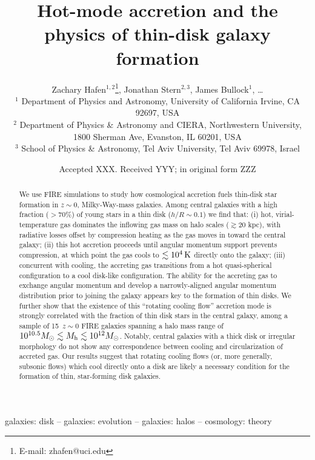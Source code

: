 \documentclass[fleqn,usenatbib]{mnras}
\title[Rotating cooling flows and thin galactic disks]{Hot-mode accretion and the physics of thin-disk galaxy formation}
\author[Hafen, Stern, Bullock et al.]{
Zachary Hafen$^{1,2}$\thanks{E-mail: zhafen@uci.edu},
Jonathan Stern$^{2,3}$,
James Bullock$^{1}$,
\ldots
\\
$^1$ Department of Physics and Astronomy, University of California Irvine, CA 92697, USA
\\
$^2$ Department of Physics \& Astronomy and CIERA, Northwestern University, 1800 Sherman Ave, Evanston, IL 60201, USA \\
$^3$ School of Physics \& Astronomy, Tel Aviv University, Tel Aviv 69978, Israel
}
\date{Accepted XXX. Received YYY; in original form ZZZ}
\newcommand{\Nsample}{15}
\begin{document}
\label{firstpage}
\pagerange{\pageref{firstpage}--\pageref{lastpage}}
\maketitle

\begin{abstract}
We use FIRE simulations to study how cosmological accretion fuels thin-disk star formation in $z\sim 0$, Milky-Way-mass galaxies.
Among central galaxies with a high fraction ($>70\%$) of young stars in a thin disk ($h/R \sim 0.1$) we find that:
(i) hot, virial-temperature gas dominates the inflowing gas mass on halo scales ($\gtrsim 20$ kpc), with radiative losses offset by compression heating as the gas moves in toward the central galaxy;
(ii) this hot accretion proceeds until angular momentum support prevents compression,  at which point the gas cools to $\lesssim10^4\,{\rm K}$ directly onto the galaxy; 
(iii) concurrent with cooling, the accreting gas %
transitions from a hot quasi-spherical configuration to a cool disk-like configuration.
The ability for the accreting gas to exchange angular momentum and develop a narrowly-aligned angular momentum distribution prior to joining the galaxy appears key to the formation of thin disks.
We further show that the existence of this ``rotating cooling flow'' accretion mode is strongly correlated with the fraction of thin disk stars in the central galaxy, among a sample of \Nsample\ $z\sim0$ FIRE galaxies spanning a halo mass range of $10^{10.5} M_\odot \lesssim M_{\rm h} \lesssim 10^{12} M_\odot$.
Notably, central galaxies with a thick disk or irregular morphology do not show any correspondence between cooling and circularization of accreted gas.
Our results suggest that rotating cooling flows (or, more generally, subsonic flows) which cool directly onto a disk are likely a necessary condition for the formation of thin, star-forming disk galaxies.
\end{abstract}

\begin{keywords}
galaxies: disk -- galaxies: evolution -- galaxies: halos -- cosmology: theory
\end{keywords}

\end{document}
